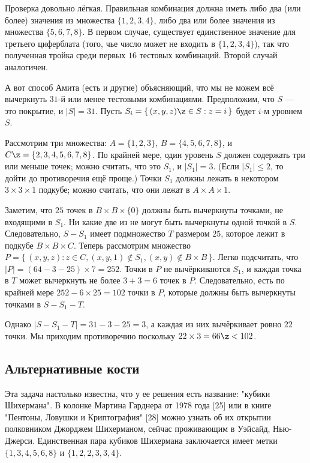 Проверка довольно лёгкая.
Правильная комбинация должна иметь либо два (или более) значения из множества $\{1, 2, 3, 4\}$, либо два или более значения из множества $\{5, 6, 7, 8\}$.
В первом случае, существует единственное значение для третьего циферблата (того, чье число может не входить в $\{1, 2, 3, 4\}$), так что полученная тройка среди первых $16$ тестовых комбинаций.
Второй случай аналогичен.

А вот способ Амита (есть и другие) объясняющий, что мы не можем всё вычеркнуть $31$-й или менее тестовыми комбинациями.
Предположим, что $S$ --- это покрытие, и $|S| = 31$.
Пусть $S_i = \{\,(x, y, z) \z\in S : z = i\,\}$ будет $i$-м уровнем $S$.

Рассмотрим три множества:
$A=\{1, 2, 3\}$,
$B = \{4, 5, 6, 7, 8\}$,
и $C \z= \{2, 3, 4, 5, 6, 7, 8\}$.
По крайней мере, один уровень $S$ должен содержать три или меньше точек;
можно считать, что это $S_1$, и $|S_1| = 3$.
(Если $|S_1| \le 2$, то дойти до противоречия ещё проще.)
Точки $S_1$ должны лежать в некотором $3 \times 3 \times 1$ подкубе;
можно считать, что они лежат в $A \times A \times {1}$.

Заметим, что $25$ точек в $B \times B \times \{0\}$ должны быть вычеркнуты точками, не входящими в $S_1$.
Ни какие две из не могут быть вычеркнуты одной точкой в $S$.
Следовательно, $S - S_1$ имеет подмножество $T$ размером $25$, которое лежит в подкубе $B \times B \times C$.
Теперь рассмотрим множество $P = \{\,(x, y, z) : z \in C, (x, y, 1) \notin S_1 , (x, y) \notin B \times B\,\}$.
Легко подсчитать, что $|P| = (64-3-25) \times 7 = 252$.
Точки в $P$ не вычёркиваются $S_1$, и каждая точка в $T$ может вычеркнуть не более $3 + 3 = 6$ точек в $P$. Следовательно, есть по крайней мере $252 - 6 \times 25 = 102$ точки в $P$, которые должны быть вычеркнуты точками в $S - S_1 - T$.

Однако $|S - S_1 - T | = 31 - 3 - 25 = 3$, а каждая из них вычёркивает ровно $22$ точки.
Мы приходим противоречию поскольку $22 \times 3 = 66 \z< 102$.

\subsection*{Альтернативные кости}

Эта задача настолько известна, что у ее решения есть название: "кубики Шихермана".
В колонке Мартина Гарднера от 1978 года [25] или в книге "Пентоны, Ловушки и Криптография" [28] можно узнать об их открытии полковником Джорджем Шихерманом, сейчас проживающим в Уэйсайд, Нью-Джерси.
Единственная пара кубиков Шихермана заключается имеет метки $\{1, 3, 4, 5, 6, 8\}$ и $\{1, 2, 2, 3, 3, 4\}$.

